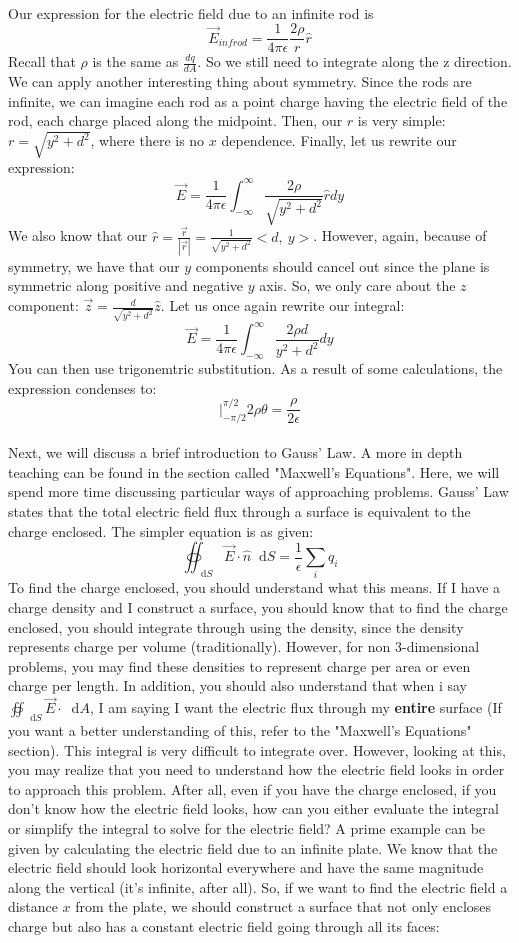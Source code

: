 \documentclass{article}
\newcommand*\dif{\mathop{}\!\mathrm{d}}
\begin{document}
\\
Our expression for the electric field due to an infinite rod is $$\vec{E}_{inf rod} = \frac{1}{4\pi\epsilon}\frac{2\rho}{r}\hat{r}$$Recall that $\rho$ is the same as $\frac{dq}{dA}$. So we still need to integrate along the z direction. We can apply another interesting thing about symmetry. Since the rods are infinite, we can imagine each rod as a point charge having the electric field of the rod, each charge placed along the midpoint. Then, our $r$ is very simple: $r = \sqrt{y^2 + d^2}$, where there is no $x$ dependence. Finally, let us rewrite our expression: $$\vec{E} = \frac{1}{4\pi\epsilon}\int_{-\infty}^{\infty} \frac{2\rho}{\sqrt{y^2 + d^2}}\hat{r} dy$$We also know that our $\hat{r} = \frac{\vec{r}}{|\vec{r}|} = \frac{1}{\sqrt{y^2 + d^2}}<d,\ y>$. However, again, because of symmetry, we have that our $y$ components should cancel out since the plane is symmetric along positive and negative $y$ axis. So, we only care about the $z$ component: $\vec{z} = \frac{d}{\sqrt{y^2 + d^2}}\hat{z}$. Let us once again rewrite our integral: $$\vec{E} = \frac{1}{4\pi\epsilon}\int_{-\infty}^{\infty} \frac{2\rho d}{y^2 + d^2} dy$$You can then use trigonemtric substitution. As a result of some calculations, the expression condenses to: $$\big|_{-\pi/2}^{\pi/2} 2\rho \theta = \frac{\rho}{2\epsilon}$$
\\
Next, we will discuss a brief introduction to Gauss' Law. A more in depth teaching can be found in the section called "Maxwell's Equations". Here, we will spend more time discussing particular ways of approaching problems. Gauss' Law states that the total electric field flux through a surface is equivalent to the charge enclosed. The simpler equation is as given: $$\oiint_{\dif S} \vec{E} \cdot \hat{n} \dif S= \frac{1}{\epsilon}\sum\limits_i q_i$$To find the charge enclosed, you should understand what this means. If I have a charge density and I construct a surface, you should know that to find the charge enclosed, you should integrate through using the density, since the density represents charge per volume (traditionally). However, for non 3-dimensional problems, you may find these densities to represent charge per area or even charge per length. In addition, you should also understand that when i say $\oiint_{\dif S} \vec{E} \cdot \dif A$, I am saying I want the electric flux through my \textbf{entire} surface (If you want a better understanding of this, refer to the "Maxwell's Equations" section). This integral is very difficult to integrate over. However, looking at this, you may realize that you need to understand how the electric field looks in order to approach this problem. After all, even if you have the charge enclosed, if you don't know how the electric field looks, how can you either evaluate the integral or simplify the integral to solve for the electric field? A prime example can be given by calculating the electric field due to an infinite plate. We know that the electric field should look horizontal everywhere and have the same magnitude along the vertical (it's infinite, after all). So, if we want to find the electric field a distance $x$ from the plate, we should construct a surface that not only encloses charge but also has a constant electric field going through all its faces:
\end{document}
